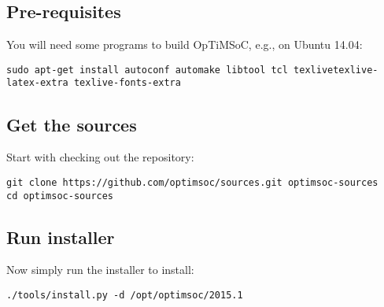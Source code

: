 \subsection{Pre-requisites}

You will need some programs to build OpTiMSoC, e.g., on Ubuntu 14.04:

\begin{lstlisting}
sudo apt-get install autoconf automake libtool tcl texlivetexlive-latex-extra texlive-fonts-extra
\end{lstlisting}

\subsection{Get the sources}

Start with checking out the repository:

\begin{lstlisting}
git clone https://github.com/optimsoc/sources.git optimsoc-sources
cd optimsoc-sources
\end{lstlisting}

\subsection{Run installer}

Now simply run the installer to install:

\begin{lstlisting}
./tools/install.py -d /opt/optimsoc/2015.1
\end{lstlisting}
